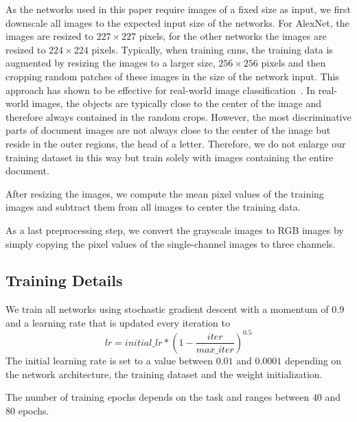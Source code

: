As the networks used in this paper require images of a fixed size as input, we first downscale all images to the expected input size of the networks. For AlexNet, the images are resized to $227\times227$ pixels, for the other networks the images are resized to $224\times224$ pixels.
Typically, when training \ac{cnn}s, the training data is augmented by resizing the images to a larger size, \eg $256\times256$ pixels and then cropping random patches of these images in the size of the network input. This approach has shown to be effective for real-world image classification~\cite{cnn_alexnet_nips2014}. In real-world images, the objects are typically close to the center of the image and therefore always contained in the random crops. However, the most discriminative parts of document images are not always close to the center of the image but reside in the outer regions, \eg the head of a letter. Therefore, we do not enlarge our training dataset in this way but train solely with images containing the entire document.

After resizing the images, we compute the mean pixel values of the training images and subtract them from all images to center the training data.

As a last preprocessing step, we convert the grayscale images to RGB images by simply copying the pixel values of the single-channel images to three channels.




\subsection{Training Details}
We train all networks using stochastic gradient descent with a momentum of $0.9$ and a learning rate that is updated every iteration to
\begin{equation}
    lr = initial\_lr * \left( 1 - \frac{iter}{max\_iter}\right) ^ {0.5}
\end{equation}
The initial learning rate is set to a value between $0.01$ and $0.0001$ depending on the network architecture, the training dataset and the weight initialization.

The number of training epochs depends on the task and ranges between $40$ and $80$ epochs.



